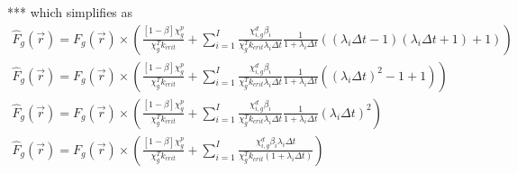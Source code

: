\documentclass[12pt]{report}
\begin{document}
	*** which simplifies as
	\begin{eqnarray}
	\hat{F}_g(\vec{r}) = F_g(\vec{r}) \times \left(\frac{\left[ 1- \beta \right] \chi_g^p}{\chi_g^T k_{crit}} + \sum_{i=1}^{I} \frac{\chi_{i,g}^d \beta_i}{\chi_g^T k_{crit} \lambda_i \Delta t} \frac{1}{1+\lambda_i \Delta t} \left( \left(\lambda_i \Delta t - 1 \right) \left(\lambda_i \Delta t + 1 \right) + 1 \right) \right) \nonumber \\
	\hat{F}_g(\vec{r}) = F_g(\vec{r}) \times \left(\frac{\left[ 1- \beta \right] \chi_g^p}{\chi_g^T k_{crit}} + \sum_{i=1}^{I} \frac{\chi_{i,g}^d \beta_i}{\chi_g^T k_{crit} \lambda_i \Delta t} \frac{1}{1+\lambda_i \Delta t} \left( \left(\lambda_i \Delta t \right)^2 -1 + 1 \right) \right) \nonumber \\
	\hat{F}_g(\vec{r}) = F_g(\vec{r}) \times \left(\frac{\left[ 1- \beta \right] \chi_g^p}{\chi_g^T k_{crit}} + \sum_{i=1}^{I} \frac{\chi_{i,g}^d \beta_i}{\chi_g^T k_{crit} \lambda_i \Delta t} \frac{1}{1+\lambda_i \Delta t} \left(\lambda_i \Delta t \right)^2  \right) \nonumber \\
	\hat{F}_g(\vec{r}) = F_g(\vec{r}) \times \left(\frac{\left[ 1- \beta \right] \chi_g^p}{\chi_g^T k_{crit}} + \sum_{i=1}^{I} \frac{\chi_{i,g}^d \beta_i \lambda_i \Delta t}{\chi_g^T k_{crit} 
	\left(1+\lambda_i \Delta t \right)} \right) \nonumber
	\end{eqnarray}
	
	
		
\end{document}
